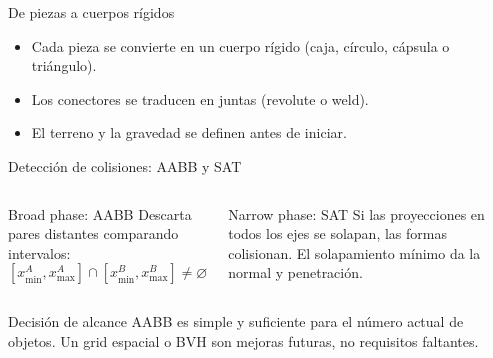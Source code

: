 \documentclass[aspectratio=169,11pt]{beamer}
\begin{document}
\begin{frame}{De piezas a cuerpos rígidos}
  \begin{center}
  \end{center}

  \vspace{0.1cm}
  \begin{itemize}
    \item Cada pieza se convierte en un cuerpo rígido (caja, círculo,
      cápsula o triángulo).
    \item Los conectores se traducen en juntas (revolute o weld).
    \item El terreno y la gravedad se definen antes de iniciar.
  \end{itemize}
\end{frame}

\begin{frame}{Detección de colisiones: AABB y SAT}
  \begin{columns}[T]
    \begin{block}{Broad phase: AABB}
      Descarta pares distantes comparando intervalos:
      \[
      [x_{\min}^{A},x_{\max}^{A}]\cap[x_{\min}^{B},x_{\max}^{B}]\neq\varnothing
      \]
    \end{block}
    \begin{block}{Narrow phase: SAT}
      Si las proyecciones en todos los ejes se solapan, las formas
      colisionan. El solapamiento mínimo da la normal y penetración.
    \end{block}
  \end{columns}

  \vspace{0.1cm}
  \begin{alertblock}{Decisión de alcance}
    AABB es simple y suficiente para el número actual de objetos. Un grid
    espacial o BVH son mejoras futuras, no requisitos faltantes.
  \end{alertblock}
\end{frame}
\end{document}
